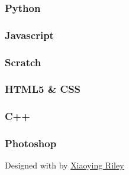 \documentclass[
]{article}
\begin{document}
\hypertarget{python}{%
\subsubsection{Python}\label{python}}

\hypertarget{javascript}{%
\subsubsection{Javascript}\label{javascript}}

\hypertarget{scratch}{%
\subsubsection{Scratch}\label{scratch}}

\hypertarget{html5-css}{%
\subsubsection{HTML5 \& CSS}\label{html5-css}}

\hypertarget{c}{%
\subsubsection{C++}\label{c}}

\hypertarget{photoshop}{%
\subsubsection{Photoshop}\label{photoshop}}

{Designed with \emph{} by \href{http://themes.3rdwavemedia.com}{Xiaoying
Riley}}
\end{document}
